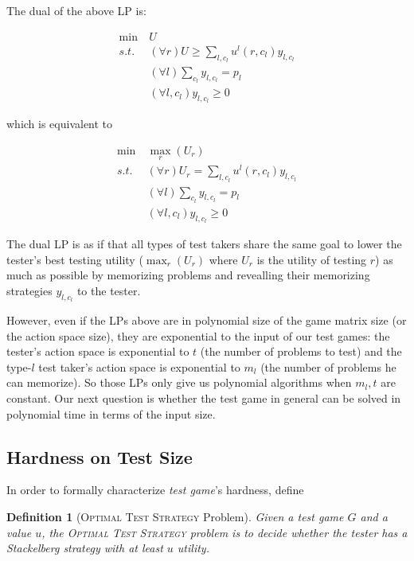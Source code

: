 \documentclass{article}
\newtheorem{definition}{Definition}
\begin{document}
The dual of the above LP is:

\begin{align}\label{eqn:dual-original}
  \min~&U\\
  s.t. &(\forall r) U \geq \sum_{l, c_l} u^l(r, c_l) y_{l, c_l}\nonumber\\
  &(\forall l) \sum_{c_l} y_{l, c_l} = p_l\nonumber\\
  &(\forall l, c_l) y_{l, c_l} \geq 0 \nonumber
\end{align}

which is equivalent to 

\begin{align}\label{eqn:minimax}
  \min~&\max_r(U_r)\\
  s.t. &(\forall r) U_r = \sum_{l, c_l} u^l(r, c_l) y_{l, c_l}\nonumber\\
  &(\forall l) \sum_{c_l} y_{l, c_l} = p_l\nonumber\\
  &(\forall l, c_l) y_{l, c_l} \geq 0\nonumber
\end{align}

The dual LP is as if that all types of test takers share the same goal to lower
the tester's best testing utility ($\max_r (U_r)$ where $U_r$ is the utility of
testing $r$) as much as possible by memorizing problems and revealling their
memorizing strategies $y_{l, c_l}$ to the tester.

However, even if the LPs above are in polynomial size of the game matrix size
(or the action space size), they are exponential to the input of our test
games: the tester's action space is exponential to $t$ (the number of problems
to test) and the type-$l$ test taker's action space is exponential to $m_l$
(the number of problems he can memorize). So those LPs only give us polynomial
algorithms when $m_l, t$ are constant. Our next question is whether the test
game in general can be solved in polynomial time in terms of the input size.

\subsection{Hardness on Test Size}

In order to formally characterize \emph{test game}'s hardness, define

\begin{definition}[\textsc{Optimal Test Strategy} Problem]
Given a test game $G$ and a value $u$, the \textsc{Optimal Test Strategy}
problem is to decide whether the tester has a Stackelberg strategy with at
least $u$ utility.
\end{definition}
\end{document}
